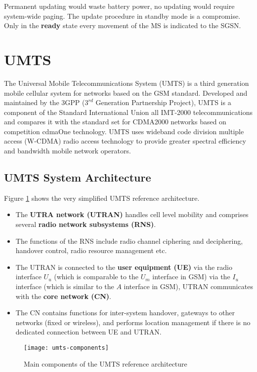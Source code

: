 Permanent updating would waste battery power, no updating would require system-wide paging. The update procedure in standby mode is a compromise. Only in the \textbf{ready} state every movement of the MS is indicated to the SGSN.



\section{UMTS}
The Universal Mobile Telecommunications System (UMTS) is a third generation mobile cellular system for networks based on the GSM standard. Developed and maintained by the 3GPP ($ 3^{rd} $ Generation Partnership Project), UMTS is a component of the Standard International Union all IMT-2000 telecommunications and compares it with the standard set for CDMA2000 networks based on competition cdmaOne technology. UMTS uses wideband code division multiple access (W-CDMA) radio access technology to provide greater spectral efficiency and bandwidth mobile network operators.

\subsection{UMTS System Architecture}

Figure \ref{fig:umts-components} shows the very simplified UMTS reference architecture.

\begin{itemize}
	\item The \textbf{UTRA network (UTRAN)} handles cell level mobility and comprises several \textbf{radio network subsystems (RNS)}. 
	\item The functions of the RNS include radio channel ciphering and deciphering, handover control, radio resource management etc.
	\item The UTRAN is connected to the \textbf{user equipment (UE)} via the radio interface $ U_u $ (which is comparable to the $ U_m $ interface in GSM) via the $ I_u $ interface (which is similar to the $ A $ interface in GSM), UTRAN communicates with the \textbf{core network (CN)}. 
	\item The CN contains functions	for inter-system handover, gateways to other networks (fixed or wireless), and performs location management if there is no dedicated connection between UE and UTRAN.
\end{itemize}

\begin{figure}[hpt]
	\centering
	\texttt{[image: umts-components]}
	\caption{Main components of the UMTS reference architecture}\label{fig:umts-components}
\end{figure}



